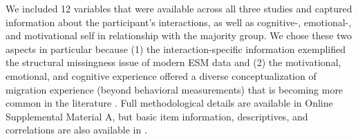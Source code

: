 We included 12 variables that were available across all three studies
and captured information about the participant's interactions, as well
as cognitive-, emotional-, and motivational self in relationship with
the majority group. We chose these two aspects in particular because (1)
the interaction-specific information exemplified the structural
missingness issue of modern ESM data and (2) the motivational,
emotional, and cognitive experience offered a diverse conceptualization
of migration experience (beyond behavioral measurements) that is
becoming more common in the literature \citep[][]{Kreienkamp2022d}. Full
methodological details are available in Online Supplemental Material A,
but basic item information, descriptives, and correlations are also
available in .


